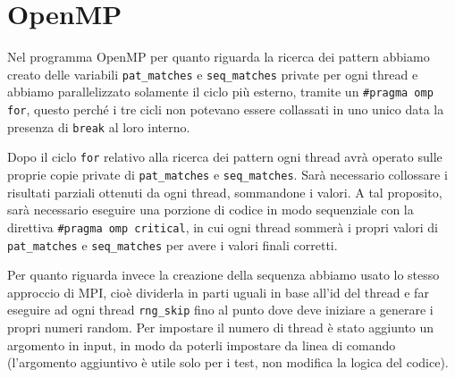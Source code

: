 \documentclass[12pt,openany]{report}
\begin{document}
\newpage
\section{OpenMP}
Nel programma OpenMP per quanto riguarda la ricerca dei pattern abbiamo creato delle variabili \texttt{pat\_matches} e \texttt{seq\_matches} private per ogni thread e abbiamo parallelizzato solamente il ciclo più esterno, tramite un \texttt{\#pragma omp for}, questo perché i tre cicli non potevano essere collassati in uno unico data la presenza di \texttt{break} al loro interno.
\bigskip

Dopo il ciclo \texttt{for} relativo alla ricerca dei pattern ogni thread avrà operato sulle proprie copie private di \texttt{pat\_matches} e \texttt{seq\_matches}. Sarà necessario collossare i risultati parziali ottenuti da ogni thread, sommandone i valori.
A tal proposito, sarà necessario eseguire una porzione di codice in modo sequenziale con la direttiva \texttt{\#pragma omp critical}, in cui ogni thread sommerà i propri valori di \texttt{pat\_matches} e \texttt{seq\_matches} per avere i valori finali corretti.\bigskip

Per quanto riguarda invece la creazione della sequenza abbiamo usato lo stesso approccio di MPI, cioè dividerla in parti uguali in base all'id del thread e far eseguire ad ogni thread \texttt{rng\_skip} fino al punto dove deve iniziare a generare i propri numeri random. Per impostare il numero di thread è stato aggiunto un argomento in input, in modo da poterli impostare da linea di comando (l'argomento aggiuntivo è utile solo per i test, non modifica la logica del codice).\bigskip
\end{document}
